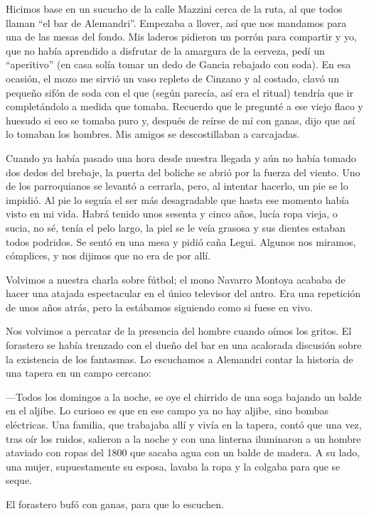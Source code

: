 \documentclass[11pt,twoside,openright]{book}
\begin{document}
Hicimos base en un sucucho de la calle Mazzini cerca de la ruta, al que todos llaman “el bar de Alemandri”. Empezaba a llover, así que nos mandamos para una de las mesas del fondo. Mis laderos pidieron un porrón para compartir y yo, que no había aprendido a disfrutar de la amargura de la cerveza, pedí un “aperitivo” (en casa solía tomar un dedo de Gancia rebajado con soda). En esa ocasión, el mozo me sirvió un vaso repleto de Cinzano y al costado, clavó un pequeño sifón de soda con el que (según parecía, así era el ritual) tendría que ir completándolo a medida que tomaba. Recuerdo que le pregunté a ese viejo flaco y huesudo si eso se tomaba puro y, después de reírse de mí con ganas, dijo que así lo tomaban los hombres. Mis amigos se descostillaban a carcajadas.

Cuando ya había pasado una hora desde nuestra llegada y aún no había tomado dos dedos del brebaje, la puerta del boliche se abrió por la fuerza del viento. Uno de los parroquianos se levantó a cerrarla, pero, al intentar hacerlo, un pie se lo impidió. Al pie lo seguía el ser más desagradable que hasta ese momento había visto en mi vida. Habrá tenido unos sesenta y cinco años, lucía ropa vieja, o sucia, no sé, tenía el pelo largo, la piel se le veía grasosa y sus dientes estaban todos podridos. Se sentó en una mesa y pidió caña Legui. Algunos nos miramos, cómplices, y nos dijimos que no era de por allí.

Volvimos a nuestra charla sobre fútbol; el mono Navarro Montoya acababa de hacer una atajada espectacular en el único televisor del antro. Era una repetición de unos años atrás, pero la estábamos siguiendo como si fuese en vivo.

Nos volvimos a percatar de la presencia del hombre cuando oímos los gritos. El forastero se había trenzado con el dueño del bar en una acalorada discusión sobre la existencia de los fantasmas. Lo escuchamos a Alemandri contar la historia de una tapera en un campo cercano:

—Todos los domingos a la noche, se oye el chirrido de una soga bajando un balde en el aljibe. Lo curioso es que en ese campo ya no hay aljibe, sino bombas eléctricas. Una familia, que trabajaba allí y vivía en la tapera, contó que una vez, tras oír los ruidos, salieron a la noche y con una linterna iluminaron a un hombre ataviado con ropas del 1800 que sacaba agua con un balde de madera. A su lado, una mujer, supuestamente su esposa, lavaba la ropa y la colgaba para que se seque.

El forastero bufó con ganas, para que lo escuchen.
\end{document}
